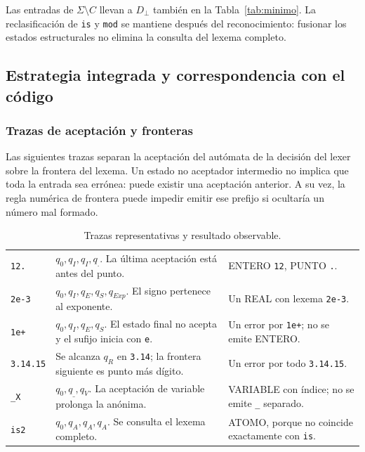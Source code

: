 Las entradas de $\Sigma\setminus C$ llevan a $D_{\bot}$ también en la Tabla~\ref{tab:minimo}. La reclasificación de \texttt{is} y \texttt{mod} se mantiene después del reconocimiento: fusionar los estados estructurales no elimina la consulta del lexema completo.

\subsection{Estrategia integrada y correspondencia con el código}

\subsubsection{Trazas de aceptación y fronteras}

Las siguientes trazas separan la aceptación del autómata de la decisión del lexer sobre la frontera del lexema. Un estado no aceptador intermedio no implica que toda la entrada sea errónea: puede existir una aceptación anterior. A su vez, la regla numérica de frontera puede impedir emitir ese prefijo si ocultaría un número mal formado.

\begin{table}[H]
\centering
\small
\caption{Trazas representativas y resultado observable.}
\begin{tabularx}{\textwidth}{L{2cm}Y L{5.5cm}}
\toprule
{} &  &  \\
\midrule
\texttt{12.} & $q_0,q_I,q_I,q_{.}$. La última aceptación está antes del punto. & ENTERO \texttt{12}, PUNTO \texttt{.}. \\
 \texttt{2e-3} & $q_0,q_I,q_E,q_S,q_{Exp}$. El signo pertenece al exponente. & Un REAL con lexema \texttt{2e-3}. \\
\texttt{1e+} & $q_0,q_I,q_E,q_S$. El estado final no acepta y el sufijo inicia con \texttt{e}. & Un error por \texttt{1e+}; no se emite ENTERO. \\
 \texttt{3.14.15} & Se alcanza $q_R$ en \texttt{3.14}; la frontera siguiente es punto más dígito. & Un error por todo \texttt{3.14.15}. \\
\texttt{\_X} & $q_0,q_{\_},q_V$. La aceptación de variable prolonga la anónima. & VARIABLE con índice; no se emite \texttt{\_} separado. \\
 \texttt{is2} & $q_0,q_A,q_A,q_A$. Se consulta el lexema completo. & ATOMO, porque no coincide exactamente con \texttt{is}. \\
\bottomrule
\end{tabularx}
\end{table}

